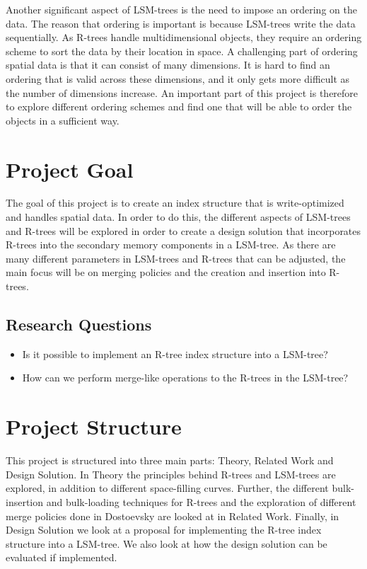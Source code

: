 \noindent
Another significant aspect of LSM-trees is the need to impose an ordering on the data. The reason that ordering is important is because LSM-trees write the data sequentially. As R-trees handle multidimensional objects, they require an ordering scheme to sort the data by their location in space. A challenging part of ordering spatial data is that it can consist of many dimensions. It is hard to find an ordering that is valid across these dimensions, and it only gets more difficult as the number of dimensions increase. An important part of this project is therefore to explore different ordering schemes and find one that will be able to order the objects in a sufficient way.

\section{Project Goal}
The goal of this project is to create an index structure that is write-optimized and handles spatial data. In order to do this, the different aspects of LSM-trees and R-trees will be explored in order to create a design solution that incorporates R-trees into the secondary memory components in a LSM-tree. As there are many different parameters in LSM-trees and R-trees that can be adjusted, the main focus will be on merging policies and the creation and insertion into R-trees. 

\subsection{Research Questions}
\begin{itemize}
    \item Is it possible to implement an R-tree index structure into a LSM-tree?
    \item How can we perform merge-like operations to the R-trees in the LSM-tree?
\end{itemize}

\section{Project Structure}
This project is structured into three main parts: Theory, Related Work and Design Solution. In Theory the principles behind R-trees and LSM-trees are explored, in addition to different space-filling curves. Further, the different bulk-insertion and bulk-loading techniques for R-trees and the exploration of different merge policies done in Dostoevsky\cite{Dostoevsky} are looked at in Related Work. Finally, in Design Solution we look at a proposal for implementing the R-tree index structure into a LSM-tree. We also look at how the design solution can be evaluated if implemented. 
